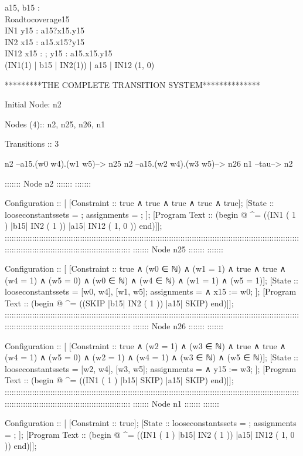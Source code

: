 \begin{circus}
\circchannel a15, b15 : \nat \cross \nat \\
\circprocess Roadtocoverage15 \circdef \circbegin \\
	IN1 \circdef y15 : \nat \circspot a15?x15.y15 \then \Skip \\
	IN2 \circdef x15 : \nat \circspot a15.x15?y15 \then \Skip \\
	IN12 \circdef x15 : \nat ; y15 : \nat \circspot a15.x15.y15 \then \Skip \\
	\circspot
	    (IN1(1) \lpar | \lchanset b15 \rchanset | \rpar IN2(1)) \lpar | \lchanset a15 \rchanset | \rpar IN12 (1, 0) \\
	\circend
\end{circus}
*********THE COMPLETE TRANSITION SYSTEM**************

Initial Node: n2

Nodes (4):: n2, n25, n26, n1

Transitions :: 3

n2 --{a15.(w0 w4).(w1 w5)}--> n25
n2 --{a15.(w2 w4).(w3 w5)}--> n26
n1 --{tau}--> n2

::::::: Node n2 :::::::  ::::::: 

Configuration :: [
[Constraint :: true  ∧  true  ∧  true  ∧  true  ∧  true]; 
[State :: looseconstantssets = {}; assignments = {}; ]; 
[Program Text :: (begin  @ ^= ((IN1 ( 1 ) |{b15}| IN2 ( 1 )) |{a15}| IN12 ( 1, 0 )) end)]];
::::::::::::::::::::::::::::::::::::::::::::::::::::::::::::::::::::::::::::::::::::::::::::::::::::::::::::::::::::::::::::::::::::::::::::::::::::::::::::::::::::::::::::::::::::::::
::::::: Node n25 :::::::  ::::::: 

Configuration :: [
[Constraint :: true  ∧  (w0  ∈  ℕ)  ∧  (w1 = 1)  ∧  true  ∧  true  ∧  (w4 = 1)  ∧  (w5 = 0)  ∧  (w0  ∈  ℕ)  ∧  (w4  ∈  ℕ)  ∧  (w1 = 1)  ∧  (w5 = 1)]; 
[State :: looseconstantssets = {[w0, w4], [w1, w5]}; assignments = {  ∧  x15 := w0}; ]; 
[Program Text :: (begin  @ ^= ((SKIP |{b15}| IN2 ( 1 )) |{a15}| SKIP) end)]];
::::::::::::::::::::::::::::::::::::::::::::::::::::::::::::::::::::::::::::::::::::::::::::::::::::::::::::::::::::::::::::::::::::::::::::::::::::::::::::::::::::::::::::::::::::::::
::::::: Node n26 :::::::  ::::::: 

Configuration :: [
[Constraint :: true  ∧  (w2 = 1)  ∧  (w3  ∈  ℕ)  ∧  true  ∧  true  ∧  (w4 = 1)  ∧  (w5 = 0)  ∧  (w2 = 1)  ∧  (w4 = 1)  ∧  (w3  ∈  ℕ)  ∧  (w5  ∈  ℕ)]; 
[State :: looseconstantssets = {[w2, w4], [w3, w5]}; assignments = {  ∧  y15 := w3}; ]; 
[Program Text :: (begin  @ ^= ((IN1 ( 1 ) |{b15}| SKIP) |{a15}| SKIP) end)]];
::::::::::::::::::::::::::::::::::::::::::::::::::::::::::::::::::::::::::::::::::::::::::::::::::::::::::::::::::::::::::::::::::::::::::::::::::::::::::::::::::::::::::::::::::::::::
::::::: Node n1 :::::::  ::::::: 

Configuration :: [
[Constraint :: true]; 
[State :: looseconstantssets = {}; assignments = {}; ]; 
[Program Text :: (begin  @ ^= ((IN1 ( 1 ) |{b15}| IN2 ( 1 )) |{a15}| IN12 ( 1, 0 )) end)]];


